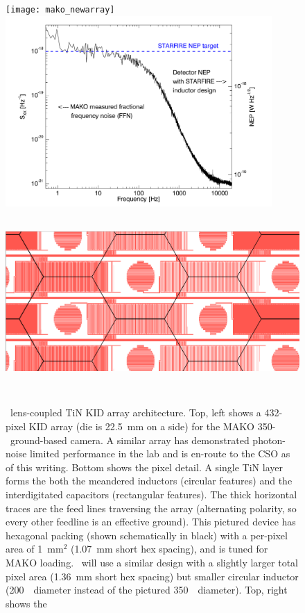 \begin{figure}[t!]
\begin{center}
\texttt{[image: mako\_newarray]}
\includegraphics*[height=7.25cm,trim=1cm 0.2cm 1cm 0.5cm]{icaris_nep}
\includegraphics*[height=7cm,trim= 9cm 5.5cm 16cm 8.2cm]{mako_new_ledit}\\
\captionbaseline\caption{\small  \name\ lens-coupled TiN KID array architecture.   Top, left shows a 432-pixel KID array (die is 22.5~mm on a side) for the MAKO 350-\mum\ ground-based camera.  A similar array has demonstrated photon-noise limited performance in the lab and is en-route to the CSO as of this writing.  Bottom shows the pixel detail.  A single TiN layer forms the both the meandered inductors (circular features) and the interdigitated capacitors (rectangular features).  The thick horizontal traces are the feed lines traversing the array (alternating polarity, so every other feedline is an effective ground).  This pictured device has hexagonal packing (shown schematically in black) with a per-pixel area of 1~mm$^2$ (1.07~mm short hex spacing), and is tuned for MAKO loading.  \name\ will use a similar design with a slightly larger total pixel area (1.36~mm short hex spacing) but smaller circular inductor (200~\mum\ diameter instead of the pictured 350~\mum\ diameter).  Top, right shows the 
}
\end{center}
\end{figure}

